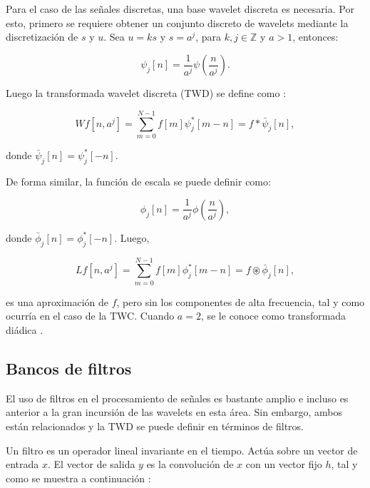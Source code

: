 Para el caso de las señales discretas, una base wavelet discreta es necesaria. Por esto, primero se requiere
obtener un conjunto discreto de wavelets mediante la discretización de $s$ y $u$. Sea $u=ks$ y $s=a^j$, 
para $k,j \in \mathbb{Z}$ y $a>1$, entonces:

\begin{equation}
	\psi_j[n] = \frac{1}{a^j}\psi\left(\frac{n}{a^j}\right).
\end{equation}

Luego la transformada wavelet discreta (TWD) se define como \cite{Mallat2008}:

\begin{equation}\label{eq:Wf}
	Wf[n,a^j] = \sum_{m=0}^{N-1} f[m] \psi_{j}^*[m-n] = f * \bar \psi_j[n],
\end{equation}

\noindent donde $\bar \psi_j[n] = \psi_j^*[-n]$.

De forma similar, la función de escala se puede definir como:

\begin{equation}
	\phi_j[n] = \frac{1}{a^j}\phi\left(\frac{n}{a^j}\right),
\end{equation}

donde $\bar \phi_j[n] = \phi_j^*[-n]$. Luego, 

\begin{equation}\label{eq:Lf}
	Lf[n,a^j] = \sum_{m=0}^{N-1} f[m] \phi_{j}^*[m-n] = f \circledast \bar \phi_j[n],
\end{equation}

\noindent es una aproximación de $f$, pero sin los componentes de alta frecuencia, tal y como ocurría en el caso
de la TWC. 
Cuando $a=2$, se le conoce como transformada diádica \cite{Mallat2008}.

\subsection{Bancos de filtros}\label{filter-banks}

El uso de filtros en el procesamiento de señales es bastante amplio e incluso es anterior a 
la gran incursión de las wavelets en esta área. 
Sin embargo, ambos están relacionados y la TWD se puede definir en términos de filtros.

Un filtro es un operador lineal invariante en el tiempo. Actúa sobre un vector de entrada $x$.
El vector de salida $y$  es la convolución de $x$ con un vector fijo $h$, tal y como se muestra
a continuación \cite{Gilbert95} :

